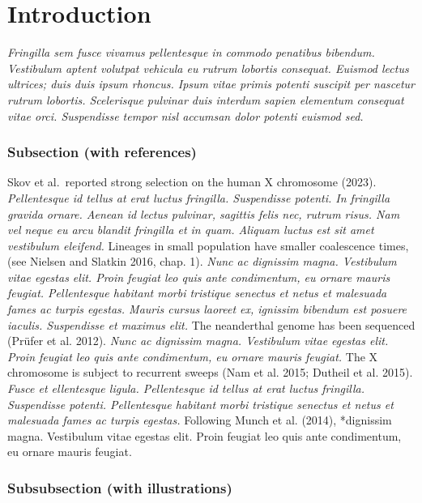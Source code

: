 \documentclass[
  10pt,
  a4paper,
]{scrbook}
\let\oldemph\emph
\renewcommand\emph[1]{\oldemph{\color{gray}#1}} %
\renewcommand*\contentsname{Table of contents}
\newcommand\contentsname{Table of contents}
\begin{document}
\renewcommand*\contentsname{Table of contents}
{
\setcounter{tocdepth}{1}
\tableofcontents
}
\listoffigures
\listoftables

\mainmatter
\chapter{Introduction}\label{introduction}

\emph{Fringilla sem fusce vivamus pellentesque in commodo penatibus
bibendum. Vestibulum aptent volutpat vehicula eu rutrum lobortis
consequat. Euismod lectus ultrices; duis duis ipsum rhoncus. Ipsum vitae
primis potenti suscipit per nascetur rutrum lobortis. Scelerisque
pulvinar duis interdum sapien elementum consequat vitae orci.
Suspendisse tempor nisl accumsan dolor potenti euismod sed.}

\subsection{Subsection (with
references)}\label{subsection-with-references}

Skov et al.~reported strong selection on the human X chromosome (2023).
\emph{Pellentesque id tellus at erat luctus fringilla. Suspendisse
potenti. In fringilla gravida ornare. Aenean id lectus pulvinar,
sagittis felis nec, rutrum risus. Nam vel neque eu arcu blandit
fringilla et in quam. Aliquam luctus est sit amet vestibulum eleifend.}
Lineages in small population have smaller coalescence times, (see
Nielsen and Slatkin 2016, chap. 1). \emph{Nunc ac dignissim magna.
Vestibulum vitae egestas elit. Proin feugiat leo quis ante condimentum,
eu ornare mauris feugiat. Pellentesque habitant morbi tristique senectus
et netus et malesuada fames ac turpis egestas. Mauris cursus laoreet ex,
ignissim bibendum est posuere iaculis. Suspendisse et maximus elit.} The
neanderthal genome has been sequenced (Prüfer et al. 2012). \emph{Nunc
ac dignissim magna. Vestibulum vitae egestas elit. Proin feugiat leo
quis ante condimentum, eu ornare mauris feugiat.} The X chromosome is
subject to recurrent sweeps (Nam et al. 2015; Dutheil et al. 2015).
\emph{Fusce et ellentesque ligula. Pellentesque id tellus at erat luctus
fringilla. Suspendisse potenti. Pellentesque habitant morbi tristique
senectus et netus et malesuada fames ac turpis egestas.} Following Munch
et al. (2014), *dignissim magna. Vestibulum vitae egestas elit. Proin
feugiat leo quis ante condimentum, eu ornare mauris feugiat.

\subsection{Subsubsection (with
illustrations)}\label{subsubsection-with-illustrations}
\end{document}
